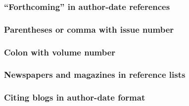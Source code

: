 \documentclass[11pt,letterpaper,oneside]{article}
\begin{document}
\subsubsection{``Forthcoming'' in author-date references}

\begin{citeref}
\item \parencite{faraday}
\end{citeref}

\setcounter{subsubsection}{46}
\subsubsection{Parentheses or comma with issue number}

\begin{citeref}
\item \parencite{glass2014}
\item \parencite{meyerovitch1959}
\end{citeref}

\subsubsection{Colon with volume number}

\begin{citeref}
\item \parencite{gunderson2015}
\end{citeref}

\subsubsection{Newspapers and magazines in reference lists}

\begin{citeref}
\item \parencite{nytimes2002}
\end{citeref}

\setcounter{subsubsection}{50}
\subsubsection{Citing blogs in author-date format}

\begin{citeref}
\item \parencite{germano2017}
\end{citeref}
\end{document}
